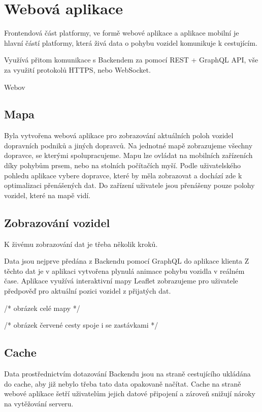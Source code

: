 \section{Webová aplikace}

Frontendová část platformy, ve formě webové aplikace a aplikace mobilní je hlavní částí platformy, která živá data o pohybu vozidel komunikuje k cestujícím.

Využívá přitom komunikace s Backendem za pomocí REST + GraphQL API, vše za využití protokolů HTTPS, nebo WebSocket.

Webov

\subsection{Mapa}
Byla vytvořena webová aplikace pro zobrazování aktuálních poloh vozidel dopravních podniků a jiných dopravců.
Na jednotné mapě zobrazujeme všechny dopravce, se kterými spolupracujeme.
Mapu lze ovládat na mobilních zařízeních díky pohybům prsem, nebo na stolních počítačích myší. Podle uživatelského pohledu aplikace vybere dopravce, které by měla zobrazovat a dochází zde k optimalizaci přenášených dat. Do zařízení uživatele jsou přenášeny pouze polohy vozidel, které na mapě vidí.

\subsection{Zobrazování vozidel}
K živému zobrazování dat je třeba několik kroků.

Data jsou nejprve předána z Backendu pomocí GraphQL do aplikace klienta
Z těchto dat je v aplikaci vytvořena plynulá animace pohybu vozidla v reálném čase.
Aplikace využívá interaktivní mapy Leaflet zobrazujeme pro uživatele předpověď pro aktuální pozici vozidel z přijatých dat.
\par
/* obrázek celé mapy */\par
/* obrázek červené cesty spoje i se zastávkami */
\subsection{Cache}
Data prostřednictvím dotazování Backendu jsou na straně cestujícího ukládána do cache, aby již nebylo třeba tato data opakovaně načítat. Cache na straně webové aplikace šetří uživatelům jejich datové připojení a zároveň snižují nároky na vytěžování serveru.

